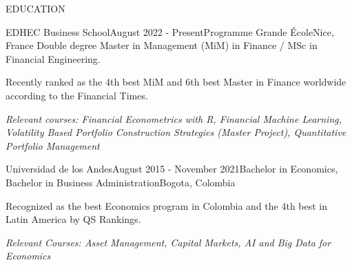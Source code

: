 \documentclass{resume} %
\begin{document}
%
%

\begin{rSection}{EDUCATION}

\vspace{0.3em}
\begin{rSubsection}{EDHEC Business School}{August 2022 - Present}{Programme Grande École}{Nice, France}
    Double degree Master in Management (MiM) in Finance / MSc in Financial Engineering.
    \item Recently ranked as the 4th best MiM and 6th best Master in Finance worldwide according to the Financial Times.
    \item \textit{Relevant courses: Financial Econometrics with R, Financial Machine Learning, Volatility Based Portfolio Construction Strategies (Master Project), Quantitative Portfolio Management}
\end{rSubsection}

\begin{rSubsection}{Universidad de los Andes}{August 2015 - November 2021}{Bachelor in Economics,  Bachelor in Business Administration}{Bogota, Colombia}
    \item Recognized as the best Economics program in Colombia and the 4th best in Latin America by QS Rankings.
    \item \textit{Relevant Courses: Asset Management, Capital Markets, AI and Big Data for Economics}
\end{rSubsection}

\end{rSection}

\vspace{0.5em}

%
%
\end{document}
